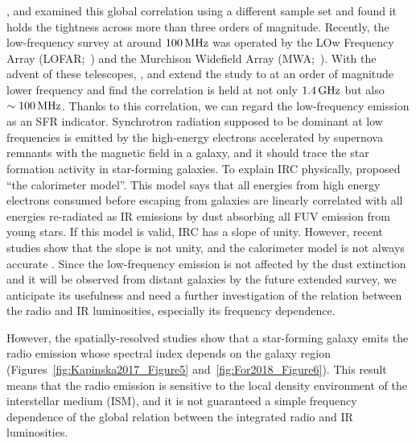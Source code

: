 \citet{Condon1991a}, \citet{Yun2001a} and \citet{Bell2003} examined this global correlation using a different sample set and found it holds the tightness across more than three orders of magnitude.
Recently, the low-frequency survey at around $100\,\mathrm{MHz}$ was operated by the LOw Frequency Array (LOFAR;~\citealt{VanHaarlem2013}) and the Murchison Widefield Array (MWA;~\citealt{Tingay2013a}).
With the advent of these telescopes, \citet{CalistroRivera2017a}, \citet{Read2018} and \citet{Wang2019} extend the study to at an order of magnitude lower frequency and find the correlation is held at not only $1.4\,\mathrm{GHz}$ but also $\sim 100\,\mathrm{MHz}$.
Thanks to this correlation, we can regard the low-frequency emission as an SFR indicator.
Synchrotron radiation supposed to be dominant at low frequencies is emitted by the high-energy electrons accelerated by supernova remnants with the magnetic field in a galaxy, and it should trace the star formation activity in star-forming galaxies.
To explain IRC physically, \citet{Volk1989} proposed ``the calorimeter model''.
This model says that all energies from high energy electrons consumed before escaping from galaxies are linearly correlated with all energies re-radiated as IR emissions by dust absorbing all FUV emission from young stars.
If this model is valid, IRC has a slope of unity.
However, recent studies show that the slope is not unity, and the calorimeter model is not always accurate \citep{CalistroRivera2017a, Read2018}.
Since the low-frequency emission is not affected by the dust extinction \citep{Yun2001a, Murphy2011} and it will be observed from distant galaxies by the future extended survey, we anticipate its usefulness and need a further investigation of the relation between the radio and IR luminosities, especially its frequency dependence.

However, the spatially-resolved studies show that a star-forming galaxy emits the radio emission whose spectral index depends on the galaxy region \citep{Kapinska2017a, For2018a, Heesen2019} (Figures~\ref{fig:Kapinska2017_Figure5} and~\ref{fig:For2018_Figure6}).
This result means that the radio emission is sensitive to the local density environment of the interstellar medium (ISM), and it is not guaranteed a simple frequency dependence of the global relation between the integrated radio and IR luminosities.

